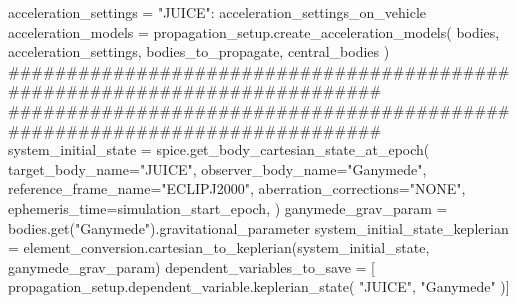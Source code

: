 {}
\markdownRendererSectionEnd \markdownRendererSectionBegin
{}\markdownRendererInterblockSeparator
{}acceleration_settings = {"JUICE": acceleration_settings_on_vehicle}\markdownRendererInterblockSeparator
{}
\markdownRendererSectionEnd \markdownRendererSectionBegin
{}\markdownRendererInterblockSeparator
{}acceleration_models = propagation_setup.create_acceleration_models( bodies, acceleration_settings, bodies_to_propagate, central_bodies )\markdownRendererInterblockSeparator
{}###########################################################################\markdownRendererInterblockSeparator
{}
\markdownRendererSectionEnd \markdownRendererSectionBegin
{}\markdownRendererInterblockSeparator
{}###########################################################################\markdownRendererInterblockSeparator
{}
\markdownRendererSectionEnd \markdownRendererSectionBegin
{}\markdownRendererInterblockSeparator
{}system_initial_state = spice.get_body_cartesian_state_at_epoch( target_body_name="JUICE", observer_body_name="Ganymede", reference_frame_name="ECLIPJ2000", aberration_corrections="NONE", ephemeris_time=simulation_start_epoch, )\markdownRendererInterblockSeparator
{}
\markdownRendererSectionEnd \markdownRendererSectionBegin
{}\markdownRendererInterblockSeparator
{}ganymede_grav_param = bodies.get("Ganymede").gravitational_parameter\markdownRendererInterblockSeparator
{}
\markdownRendererSectionEnd \markdownRendererSectionBegin
{}\markdownRendererInterblockSeparator
{}
\markdownRendererSectionEnd \markdownRendererSectionBegin
{}\markdownRendererInterblockSeparator
{}system_initial_state_keplerian = element_conversion.cartesian_to_keplerian(system_initial_state, ganymede_grav_param)\markdownRendererInterblockSeparator
{}
\markdownRendererSectionEnd \markdownRendererSectionBegin
{}\markdownRendererInterblockSeparator
{}
\markdownRendererSectionEnd \markdownRendererSectionBegin
{}\markdownRendererInterblockSeparator
{}dependent_variables_to_save = [ propagation_setup.dependent_variable.keplerian_state( "JUICE", "Ganymede" )]\markdownRendererInterblockSeparator
